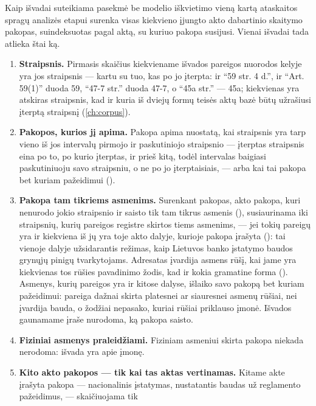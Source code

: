 \begin{codebox}{Kaip išvadai suteikiama pasekmė be modelio iškvietimo}
 vieną kartą ataskaitos spragų analizės etapui surenka visas kiekvieno
įjungto akto dabartinio skaitymo pakopas, suindeksuotas pagal aktą, su kuriuo pakopa susijusi.
Vienai išvadai  tada atlieka štai ką.
\begin{enumerate}
  \item \textbf{Straipsnis.} Pirmasis skaičius kiekviename išvados pareigos nuorodos kelyje yra
    jos straipsnis --- kartu su tuo, kas po jo įterpta: ir \enquote{59 str. 4 d.}, ir
    \enquote{Art. 59(1)} duoda 59, \enquote{47-7 str.} duoda 47-7, o \enquote{45a str.} --- 45a;
    kiekvienas yra atskiras straipsnis, kad ir kuria iš dviejų formų teisės aktų bazė būtų
    užrašiusi įterptą straipsnį (\cref{ch:corpus}).
  \item \textbf{Pakopos, kurios jį apima.} Pakopa apima nuostatą, kai straipsnis yra tarp vieno
    iš jos intervalų pirmojo ir paskutiniojo straipsnio --- įterptas straipsnis eina po to, po
    kurio įterptas, ir prieš kitą, todėl intervalas baigiasi paskutiniuoju savo straipsniu, o ne
    po jo įterptaisiais, --- arba kai tai pakopa bet kuriam pažeidimui ().
  \item \textbf{Pakopa tam tikriems asmenims.} Surenkant pakopas, akto pakopa, kuri nenurodo
    jokio straipsnio ir saisto tik tam tikrus asmenis (), susiaurinama iki
    straipsnių, kurių pareigos registre skirtos tiems asmenims, --- jei tokių pareigų yra ir
    kiekviena iš jų yra toje akto dalyje, kurioje pakopa įrašyta (): tai vienoje
    dalyje užsidarantis režimas, kaip Lietuvos banko įstatymo baudos grynųjų pinigų
    tvarkytojams. Adresatas įvardija asmens rūšį, kai jame yra kiekvienas tos rūšies
    pavadinimo žodis, kad ir kokia gramatine forma (). Asmenys, kurių pareigos
    yra ir kitose dalyse, išlaiko savo pakopą bet kuriam pažeidimui: pareiga dažnai skirta
    platesnei ar siauresnei asmenų rūšiai, nei įvardija bauda, o žodžiai nepasako, kuriai
    rūšiai priklauso įmonė. Išvados gaunamame įraše nurodoma, ką pakopa saisto.
  \item \textbf{Fiziniai asmenys praleidžiami.} Fiziniam asmeniui skirta pakopa niekada
    nerodoma: išvada yra apie įmonę.
  \item \textbf{Kito akto pakopos --- tik kai tas aktas vertinamas.} Kitame akte įrašyta pakopa
    --- nacionalinis įstatymas, nustatantis baudas už reglamento pažeidimus, --- skaičiuojama tik

\end{enumerate}
\end{codebox}
